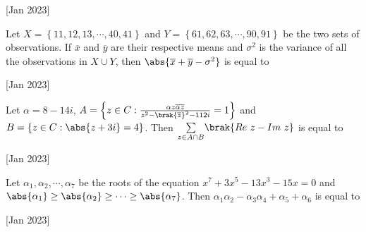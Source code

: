     \hfill[Jan 2023]
        
    \item Let $X=\left\{ 11,12,13,\cdots,40,41\right\}$ and $Y=\left\{61,62,63,\cdots,90,91\right\}$ be the two sets of observations. If $\overline{x}$ and $\overline{y}$ are their respective means and $\sigma^2$ is the variance  of all the observations in $X\cup Y$, then $\abs{\overline{x}+\overline{y}-\sigma^2}$ is equal to
    
    \hfill[Jan 2023]

    \item Let $\alpha =8-14i$, $A=\left\{z\in C:\frac{\alpha z\overline{\alpha}\overline{z}}{z^2-\brak{\overline{z}}^2-112i}=1\right\}$ and $B=\left\{z\in C:\abs{z+3i}=4\right\}$. Then $\underset{z\in A\cap B}{\sum}\brak{Re\ z-Im\ z}$ is equal to
    
    \hfill[Jan 2023]

    \item Let $\alpha_1,\alpha_2,\cdots,\alpha_7$ be the roots of the equation $x^7+3x^5-13x^3-15x=0$ and $\abs{\alpha_1}\geq\abs{\alpha_2}\geq\cdots\geq\abs{\alpha_7}$. Then $\alpha_1\alpha_2-\alpha_3\alpha_4+\alpha_5+\alpha_6$ is equal to
    
    \hfill[Jan 2023]

